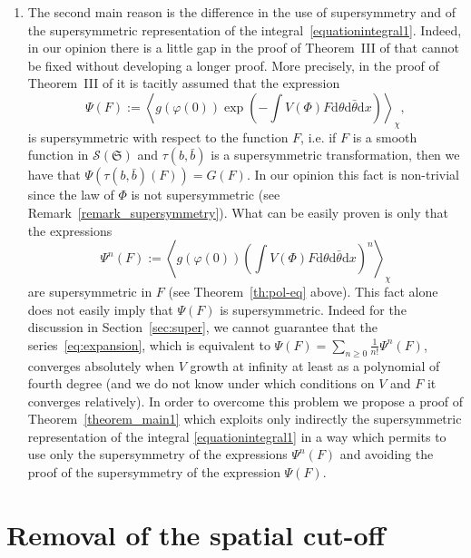 \documentclass[a4paper,10pt]{article}
\newcommand{\assign}{:=}
\newcommand{\mathd}{\mathrm{d}}
\newenvironment{enumeratenumeric}{\begin{enumerate}[1.] }{\end{enumerate}}
\begin{document}
\begin{remark}
\begin{enumeratenumeric}
    \item The second main reason is the difference in the use of supersymmetry
    and of the supersymmetric representation of the
    integral~{\eqref{equationintegral1}}. Indeed, in our opinion there is a
    little gap in the proof of Theorem~III of {\cite{Klein1984}} that cannot
    be fixed without developing a longer proof. More precisely, in the proof
    of Theorem~III of {\cite{Klein1984}} it is tacitly assumed that the
    expression
    \[ \Psi (F) \assign \left\langle g (\varphi (0)) \exp \left( - \int V
       (\Phi) F \mathd \theta \mathd \bar{\theta} \mathd x \right)
       \right\rangle_{\chi}, \]
    is supersymmetric with respect to the function $F$, i.e. if $F$ is a
    smooth function in $\mathcal{S} (\mathfrak{S})$ and $\tau (b, \bar{b})$ is
    a supersymmetric transformation, then we have that $\Psi (\tau (b,
    \bar{b}) (F)) = G (F)$. In our opinion this fact is non-trivial since the
    law of $\Phi$ is not supersymmetric (see
    Remark~\ref{remark_supersymmetry}). What can be easily proven is only that
    the expressions
    \[ \Psi^n (F) \assign \left\langle g (\varphi (0)) \left( \int V (\Phi) F
       \mathd \theta \mathd \bar{\theta} \mathd x \right)^n
       \right\rangle_{\chi} \]
    are supersymmetric in $F$ (see Theorem~\ref{th:pol-eq} above). This fact
    alone does not easily imply that $\Psi (F)$ is supersymmetric. Indeed for
    the discussion in Section~\ref{sec:super}, we cannot guarantee that the
    series~{\eqref{eq:expansion}}, which is equivalent to $\Psi (F) = \sum_{n
    \geqslant 0} \frac{1}{n!} \Psi^n (F)$, converges absolutely when $V$
    growth at infinity at least as a polynomial of fourth degree (and we do
    not know under which conditions on $V$ and $F$ it converges relatively).
    In order to overcome this problem we propose a proof of
    Theorem~\ref{theorem_main1} which exploits only indirectly the
    supersymmetric representation of the integral {\eqref{equationintegral1}}
    in a way which permits to use only the supersymmetry of the expressions
    $\Psi^n (F)$ and avoiding the proof of the supersymmetry of the expression
    $\Psi (F)$.
  \end{enumeratenumeric}
\end{remark}

\section{Removal of the spatial cut-off}
\end{document}
